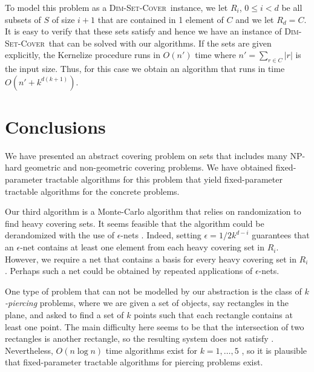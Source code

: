\documentclass[ccfonts,lotsofwhite]{patmorin}
\newcommand{\setcover}{\textsc{Dim-Set-Cover}}
\begin{document}
To model this problem as a \setcover\ instance, we let $R_i$, $0\le i<
d$ be all subsets of $S$ of size $i+1$ that are contained in 1 element
of $C$ and we let $R_{d}=C$.  It is easy to verify that these sets
satisfy  and hence we have an instance of
\setcover\ that can be solved with our algorithms.  If the sets are
given explicitly, the Kernelize procedure runs in $O(n')$ time where
$n'=\sum_{r\in C}|r|$ is the input size.  Thus, for this case we
obtain an algorithm that runs in time $O(n'+k^{d(k+1)})$.

\section{Conclusions}

We have presented an abstract covering problem on sets that includes
many NP-hard geometric and non-geometric covering problems.  We have
obtained fixed-parameter tractable algorithms for this problem that
yield fixed-parameter tractable algorithms for the concrete problems.

Our third algorithm is a Monte-Carlo algorithm that relies on
randomization to find heavy covering sets.  It seems feasible that the
algorithm could be derandomized with the use of $\epsilon$-nets
\cite{cm96,hw87,m95}.  Indeed, setting $\epsilon=1/2k^{d-i}$
guarantees that an $\epsilon$-net contains at least one element from
each heavy covering set in $R_i$.  However, we require a net that
contains a basis for every heavy covering set in $R_i$.  Perhaps such
a net could be obtained by repeated applications of $\epsilon$-nets.

One type of problem that can not be modelled by our abstraction is the
class of \emph{$k$-piercing} problems, where we are given a set of
objects, say rectangles in the plane, and asked to find a set of $k$
points such that each rectangle contains at least one point.  The main
difficulty here seems to be that the intersection of two rectangles is
another rectangle, so the resulting system does not satisfy
.  Nevertheless, $O(n\log n)$ time algorithms
exist for $k=1,\ldots,5$ \cite{mt97,n97,s99,sw96}, so it is plausible that
fixed-parameter tractable algorithms for piercing problems exist.





\end{document}
